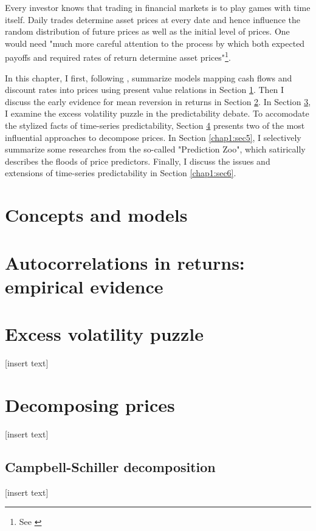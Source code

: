 \minitoc

\vspace{0.5cm}
Every investor knows that trading in financial markets is to play
games with time itself. Daily trades determine asset prices at every date and hence
influence the random distribution of future prices as well as the initial
level of prices. One would need "much more careful attention to the process
by which both expected payoffs and required rates of return determine
asset prices"\footnote{See \citet[p.~121]{campbell2017financial}}.

In this chapter, I first, following \citet[Chapter~5]{campbell2017financial}, summarize models 
mapping cash flows and discount rates into prices using present value relations in Section \ref{chap1:sec1}.
Then I discuss the early evidence for mean reversion in returns in Section \ref{chap1:sec2}.
In Section \ref{chap1:sec3}, I examine the excess volatility puzzle in the predictability debate.
To accomodate the stylized facts of time-series predictability, Section \ref{chap1:sec4}
presents two of the most influential approaches to decompose prices. In Section \ref{chap1:sec5},
I selectively summarize some researches from the so-called "Prediction Zoo", which satirically 
describes the floods of price predictors. Finally, I discuss the issues and extensions of time-series
predictability in Section \ref{chap1:sec6}.

\section{Concepts and models}\label{chap1:sec1}


\section{Autocorrelations in returns: empirical evidence}\label{chap1:sec2}


\section{Excess volatility puzzle}\label{chap1:sec3}
[insert text]

\section{Decomposing prices}\label{chap1:sec4}
[insert text]

\subsection{Campbell-Schiller decomposition}\label{chap1:sec4:ssec1}
[insert text]


